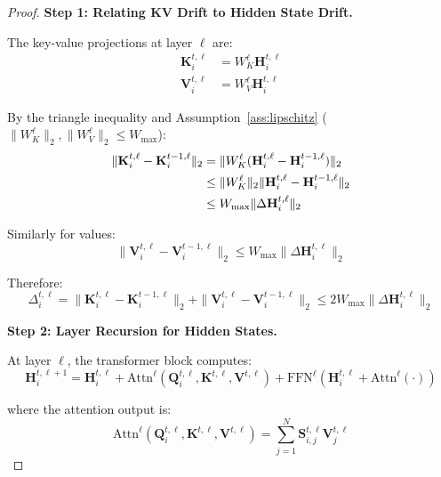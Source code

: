 \documentclass{article} %
\theoremstyle{definition}
\theoremstyle{remark}
\begin{document}
\begin{proof}

\textbf{Step 1: Relating KV Drift to Hidden State Drift.}

The key-value projections at layer $\ell$ are:
\begin{align}
\mathbf{K}^{t,\ell}_i &= W_K^{\ell} \mathbf{H}^{t,\ell}_i\\
\mathbf{V}^{t,\ell}_i &= W_V^{\ell} \mathbf{H}^{t,\ell}_i
\end{align}

By the triangle inequality and Assumption~\ref{ass:lipschitz} ($\|W_K^{\ell}\|_2, \|W_V^{\ell}\|_2 \leq W_{\max}$):
\begin{align}
\|\mathbf{K}^{t,\ell}_i - \mathbf{K}^{t-1,\ell}_i\|_2 &= \|W_K^{\ell}(\mathbf{H}^{t,\ell}_i - \mathbf{H}^{t-1,\ell}_i)\|_2 \notag\\
&\leq \|W_K^{\ell}\|_2 \|\mathbf{H}^{t,\ell}_i - \mathbf{H}^{t-1,\ell}_i\|_2 \notag\\
&\leq W_{\max} \|\Delta\mathbf{H}^{t,\ell}_i\|_2
\end{align}

Similarly for values:
\begin{equation}
\|\mathbf{V}^{t,\ell}_i - \mathbf{V}^{t-1,\ell}_i\|_2 \leq W_{\max} \|\Delta\mathbf{H}^{t,\ell}_i\|_2
\end{equation}

Therefore:
\begin{equation}\label{eq:kv-drift-bound-detailed}
\Delta^{t,\ell}_i = \|\mathbf{K}^{t,\ell}_i - \mathbf{K}^{t-1,\ell}_i\|_2 + \|\mathbf{V}^{t,\ell}_i - \mathbf{V}^{t-1,\ell}_i\|_2 \leq 2W_{\max} \|\Delta\mathbf{H}^{t,\ell}_i\|_2
\end{equation}

\textbf{Step 2: Layer Recursion for Hidden States.}

At layer $\ell$, the transformer block computes:
\begin{equation}
\mathbf{H}^{t,\ell+1}_i = \mathbf{H}^{t,\ell}_i + \text{Attn}^{\ell}(\mathbf{Q}^{t,\ell}_i, \mathbf{K}^{t,\ell}, \mathbf{V}^{t,\ell}) + \text{FFN}^{\ell}(\mathbf{H}^{t,\ell}_i + \text{Attn}^{\ell}(\cdot))
\end{equation}

where the attention output is:
\begin{equation}
\text{Attn}^{\ell}(\mathbf{Q}^{t,\ell}_i, \mathbf{K}^{t,\ell}, \mathbf{V}^{t,\ell}) = \sum_{j=1}^N \mathbf{S}^{t,\ell}_{i,j} \mathbf{V}^{t,\ell}_j
\end{equation}


\end{proof}
\end{document}
